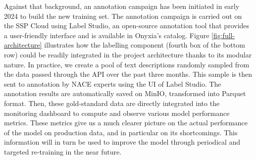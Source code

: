 Against that background, an annotation campaign has been initiated in early 2024 to build the new training set. The annotation campaign is carried out on the SSP Cloud using Label Studio, an open-source annotation tool that provides a user-friendly interface and is available in Onyxia's catalog. Figure \ref{fig:full-architecture} illustrates how the labelling component (fourth box of the bottom row) could be readily integrated in the project architecture thanks to its modular nature. In practice, we create a pool of text descriptions randomly sampled from the data passed through the API over the past three months. This sample is then sent to annotation by NACE experts using the UI of Label Studio. The annotation results are automatically saved on MinIO, transformed into Parquet format. Then, these gold-standard data are directly integrated into the monitoring dashboard to compute and observe various model performance metrics. These metrics give us a much clearer picture on the actual performance of the model on production data, and in particular on its shortcomings. This information will in turn be used to improve the model through periodical and targeted re-training in the near future. 
